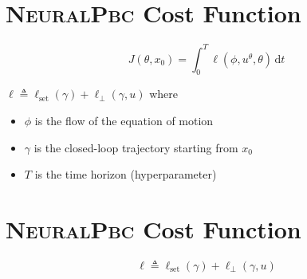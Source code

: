 \documentclass[
]{report}
\begin{document}
\hypertarget{neuralpbc-cost-function}{%
\section{\texorpdfstring{\textsc{NeuralPbc} Cost
Function}{NeuralPbc Cost Function}}\label{neuralpbc-cost-function}}

\[
J(\theta, x_0) = \int_{0}^{T} \ell \left(\phi,u^\theta,\theta\right)\, \text{d} t
\]

\(\ell \triangleq \ell_{\text{set}}(\gamma) + \ell_{\bot}(\gamma,u)\)
where

\begin{itemize}
\item
  \(\phi\) is the flow of the equation of motion
\item
  \(\gamma\) is the closed-loop trajectory starting from \(x_0\)
\item
  \(T\) is the time horizon (hyperparameter)
\end{itemize}

\hypertarget{neuralpbc-cost-function-1}{%
\section{\texorpdfstring{\textsc{NeuralPbc} Cost
Function}{NeuralPbc Cost Function}}\label{neuralpbc-cost-function-1}}

\[\ell \triangleq \ell_{\text{set}}(\gamma) + \ell_{\bot}(\gamma,u)\]
\end{document}
